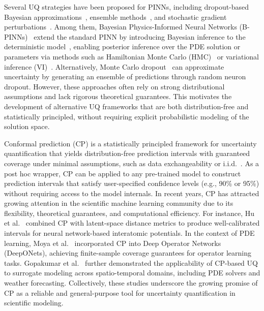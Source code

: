 \documentclass[preprint,12pt]{elsarticle}
\begin{document}
Several UQ strategies have been proposed for PINNs, including dropout-based Bayesian approximations~\cite{alhajeri_physics-informed_2022}, ensemble methods~\cite{haitsiukevich_improved_2023}, and stochastic gradient perturbations~\cite{fu2014stochastic}. Among them, Bayesian Physics-Informed Neural Networks (B-PINNs)~\cite{yang_b-pinns_2021} extend the standard PINN by introducing Bayesian inference to the deterministic model~\cite{linka_bayesian_2022}, enabling posterior inference over the PDE solution or parameters via methods such as Hamiltonian Monte Carlo (HMC)~\cite{yang_b-pinns_2021, betancourt2017conceptual} or variational inference (VI)~\cite{yang_b-pinns_2021, blundell_weight_2015}. Alternatively, Monte Carlo dropout~\cite{gal_dropout_2016} can approximate uncertainty by generating an ensemble of predictions through random neuron dropout. However, these approaches often rely on strong distributional assumptions and lack rigorous theoretical guarantees. This motivates the development of alternative UQ frameworks that are both distribution-free and statistically principled, without requiring explicit probabilistic modeling of the solution space.

Conformal prediction (CP) is a statistically principled framework for uncertainty quantification that yields distribution-free prediction intervals with guaranteed coverage under minimal assumptions, such as data exchangeability or i.i.d.~\cite{shafer2008tutorial, angelopoulos2023conformal}. As a post hoc wrapper, CP can be applied to any pre-trained model to construct prediction intervals that satisfy user-specified confidence levels (e.g., 90\% or 95\%) without requiring access to the model internals. In recent years, CP has attracted growing attention in the scientific machine learning community due to its flexibility, theoretical guarantees, and computational efficiency. For instance, Hu et al.~\cite{hu_robust_2022} combined CP with latent-space distance metrics to produce well-calibrated intervals for neural network-based interatomic potentials. In the context of PDE learning, Moya et al.~\cite{moya_conformalized-deeponet_2025} incorporated CP into Deep Operator Networks (DeepONets), achieving finite-sample coverage guarantees for operator learning tasks. Gopakumar et al.~\cite{gopakumar_uncertainty_2024} further demonstrated the applicability of CP-based UQ to surrogate modeling across spatio-temporal domains, including PDE solvers and weather forecasting. Collectively, these studies underscore the growing promise of CP as a reliable and general-purpose tool for uncertainty quantification in scientific modeling.
\end{document}
